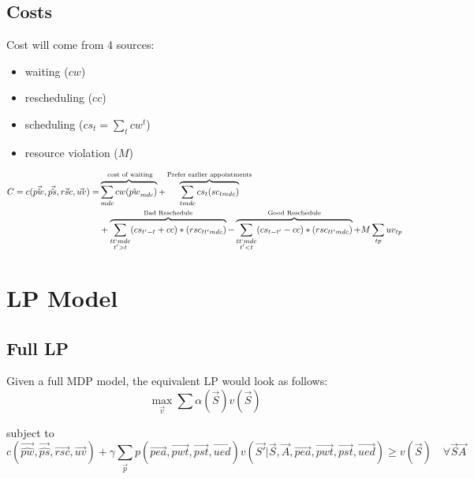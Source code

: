 \documentclass{article}
\begin{document}
\subsection{Costs}
Cost will come from 4 sources:  
\begin{itemize} 
	\item waiting ($cw$)
	\item rescheduling ($cc$) 
	\item scheduling ($cs_{t} = \sum_{t}cw^{t}$)
	\item resource violation ($M$)
\end{itemize}

\begin{equation}\begin{alignedat}{10}
	& C = c(\vec{\hat{pw}}, \vec{\hat{ps}}, \vec{rsc}, \vec{uv}) = 
		&& 
			\overbrace{ \sum_{mdc} cw (\hat{pw}_{mdc}) }^\text{
				cost of waiting}  + 
			\overbrace{
				\sum_{tmdc} cs_{t} (sc_{tmdc})
			}^\text{Prefer earlier appointments} \\ 
	&	&&  +
			\overbrace{
				\sum_{
				\substack{tt`mdc \\ t' > t}} 
				(cs_{t'-t} + cc) * (rsc_{tt'mdc})}^\text{Bad Reschedule} - 
			\overbrace{ 
				\sum_{
				\substack{tt`mdc \\ t' < t}}
				(cs_{t-t'} - cc) * (rsc_{tt'mdc})}^\text{Good Reschedule} + 
			M \sum_{tp} uv_{tp}
\end{alignedat}\end{equation}

\section{LP Model}

\subsection{Full LP} 
Given a full MDP model, the equivalent LP would look as follows:
\begin{equation}
	\max_{\vec{v}} \sum \alpha (\vec{S}) v(\vec{S}) 
\end{equation}

subject to
\begin{equation}
	c(\vec{\hat{pw}}, \vec{\hat{ps}}, \vec{rsc}, \vec{uv}) + \gamma \sum_{\vec{p}} p(\vec{pea}, \vec{pwt}, \vec{pst}, \vec{ued}) v( \vec{S'} | \vec{S}, \vec{A}, \vec{pea}, \vec{pwt}, \vec{pst}, \vec{ued}) \ge v(\vec{S}) \quad \forall \vec{S} \vec{A}
\end{equation}
\end{document}
